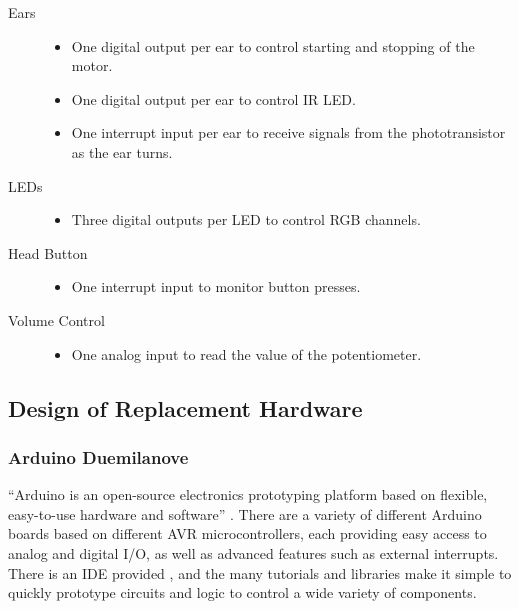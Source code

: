 \documentclass[12pt, a4paper]{article}
\begin{document}
			\begin{description}
				\item[Ears]\hfill
					\begin{itemize}
						\item One digital output per ear to control starting and stopping of the motor.
						\item One digital output per ear to control \ac{IR} \ac{LED}.
						\item One interrupt input per ear to receive signals from the phototransistor as the ear turns.
					\end{itemize}
				\item[\ac{LED}s]\hfill
					\begin{itemize}
						\item Three digital outputs per \ac{LED} to control \ac{RGB} channels.
					\end{itemize}
				\item[Head Button]\hfill
					\begin{itemize}
						\item One interrupt input to monitor button presses.
					\end{itemize}
				\item[Volume Control]\hfill
					\begin{itemize}
						\item One analog input to read the value of the potentiometer.
					\end{itemize}
			\end{description}
		
		\subsection{Design of Replacement Hardware}
			
		\subsubsection{Arduino Duemilanove}
		
		``Arduino is an open-source electronics prototyping platform based on flexible, easy-to-use hardware and software'' \parencite{arduino}. There are a variety of different Arduino boards based on different AVR microcontrollers, each providing easy access to analog and digital \ac{I/O}, as well as advanced features such as external interrupts. There is an \ac{IDE} provided \parencite{arduinoide}, and the many tutorials and libraries make it simple to quickly prototype circuits and logic to control a wide variety of components.
			
\end{document}
